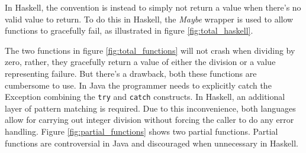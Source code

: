 \begin{figure}
\end{figure}


In Haskell, the convention is instead to simply not return a value when there's
no valid value to return. To do this in Haskell, the \emph{Maybe} wrapper is
used to allow functions to gracefully fail, as illustrated in figure
\ref{fig:total_haskell}.

The two functions in figure \ref{fig:total_functions} will not crash when dividing
by zero, rather, they gracefully return a value of either the division or a
value representing failure. But there's a drawback, both these functions are
cumbersome to use. In Java the programmer needs to explicitly catch the
Exception combining the \texttt{try} and \texttt{catch} constructs.
\cite{oracle_java_doc_compile_time_checking_of_exceptions}
\cite{oracle_java_doc_catch} In Haskell, an additional layer of pattern
matching is required. Due to this inconvenience, both languages allow
for carrying out integer division without forcing the caller to do any
error handling. Figure \ref{fig:partial_functions} shows two partial
functions. Partial functions are controversial in Java
\cite{oracle_java_doc_controversy} and discouraged when unnecessary in
Haskell. \cite{haskellwiki_avoiding_partial_functions}

